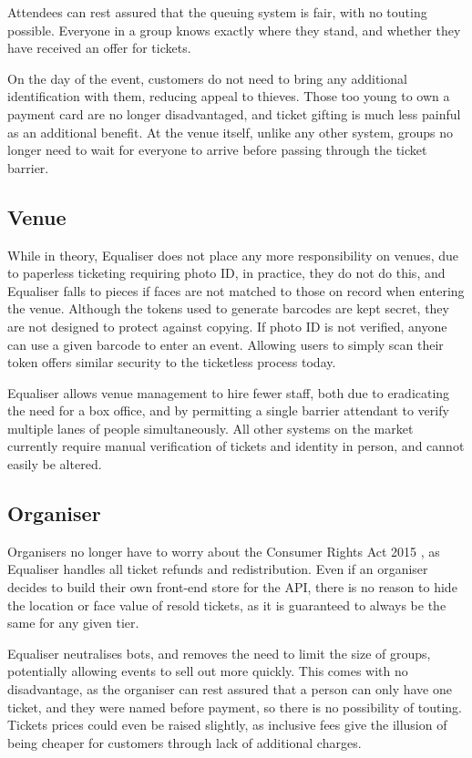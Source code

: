 \documentclass[12pt,a4paper]{bhamdissertation}
\begin{document}
Attendees can rest assured that the queuing system is fair, with no touting possible. Everyone in a group knows exactly where they stand, and whether they have received an offer for tickets.

On the day of the event, customers do not need to bring any additional identification with them, reducing appeal to thieves. Those too young to own a payment card are no longer disadvantaged, and ticket gifting is much less painful as an additional benefit. At the venue itself, unlike any other system, groups no longer need to wait for everyone to arrive before passing through the ticket barrier.

\subsection{Venue}

While in theory, Equaliser does not place any more responsibility on venues, due to paperless ticketing requiring photo ID, in practice, they do not do this, and Equaliser falls to pieces if faces are not matched to those on record when entering the venue. Although the tokens used to generate barcodes are kept secret, they are not designed to protect against copying. If photo ID is not verified, anyone can use a given barcode to enter an event. Allowing users to simply scan their token offers similar security to the ticketless process today.

Equaliser allows venue management to hire fewer staff, both due to eradicating the need for a box office, and by permitting a single barrier attendant to verify multiple lanes of people simultaneously. All other systems on the market currently require manual verification of tickets and identity in person, and cannot easily be altered.

\subsection{Organiser}

Organisers no longer have to worry about the Consumer Rights Act 2015 \cite{H15}, as Equaliser handles all ticket refunds and redistribution. Even if an organiser decides to build their own front-end store for the API, there is no reason to hide the location or face value of resold tickets, as it is guaranteed to always be the same for any given tier.

Equaliser neutralises bots, and removes the need to limit the size of groups, potentially allowing events to sell out more quickly. This comes with no disadvantage, as the organiser can rest assured that a person can only have one ticket, and they were named before payment, so there is no possibility of touting. Tickets prices could even be raised slightly, as inclusive fees give the illusion of being cheaper for customers through lack of additional charges.
\end{document}
